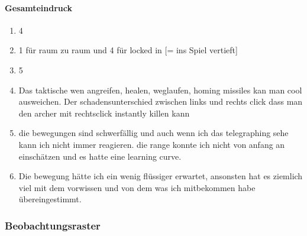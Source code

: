 \documentclass[../Main.tex]{subfiles}
\begin{document}
\paragraph{Gesamteindruck}
\begin{enumerate}[label=\textbf{Q\arabic*}, leftmargin=1.5cm, itemsep=0.8em, resume]
\item 4
\item 1 für raum zu raum und 4 für locked in [= ins Spiel vertieft]
\item 5
\item Das taktische wen angreifen, healen, weglaufen, homing missiles kan man cool ausweichen. Der schadensunterschied zwischen links und rechts click dass man den archer mit rechtsclick instantly killen kann
\item die bewegungen sind schwerfällig und auch wenn ich das telegraphing sehe kann ich nicht immer reagieren. die range konnte ich nicht von anfang an einschätzen und es hatte eine learning curve.
\item Die bewegung hätte ich ein wenig flüssiger erwartet, ansonsten hat es ziemlich viel mit dem vorwissen und von dem was ich mitbekommen habe übereingestimmt.
\end{enumerate}

\subsubsection{Beobachtungsraster}
\end{document}
